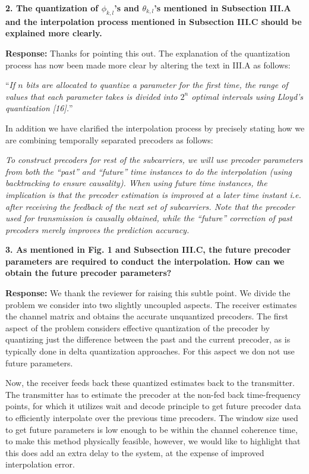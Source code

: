 \documentclass[12pt]{letter}
\begin{document}
\textbf{2. The quantization of $\phi_{k,l}$'s and $\theta_{k,l}$'s mentioned in Subsection III.A and the interpolation
process mentioned in Subsection III.C should be explained more clearly.}

\textbf{Response:}
Thanks for pointing this out. The explanation of the quantization
process has now been made more  clear by altering the text in III.A as
follows:

``\emph{If $n$ bits are allocated to quantize a parameter
for the first time, the range of values that each parameter takes is
divided into $2^n$ optimal intervals using Lloyd's
quantization [16].}''

In addition we have clarified the interpolation process by precisely stating
how we are combining temporally separated precoders as follows:

\emph{To construct precoders for rest of the subcarriers, we will use
precoder parameters from both the ``past'' and ``future'' time
instances to do the interpolation (using backtracking to ensure
causality). When using future time instances, the implication is that the precoder
estimation is improved at a later time instant i.e. after receiving
the feedback of the next set of subcarriers. Note that the precoder
used for transmission is causally obtained, while the ``future''
correction of past precoders merely improves the prediction
accuracy.}

\textbf{3. As mentioned in Fig. 1 and Subsection III.C, the future
  precoder parameters are required to conduct the interpolation. How
  can we obtain the future precoder parameters?}

\textbf{Response:} We thank the reviewer for raising this subtle
point. We divide the problem we consider into two slightly uncoupled
aspects. The receiver estimates the channel matrix and obtains the
accurate unquantized precoders. The first aspect of the problem
considers effective quantization of the precoder by quantizing just
the difference between the past and the current precoder, as is
typically done in delta quantization approaches. For this aspect we
don not use future parameters.

Now, the receiver feeds back these quantized estimates back to the
transmitter. The transmitter has to estimate the precoder at the
non-fed back time-frequency points, for which it utilizes wait and
decode principle to get future precoder data to efficiently
interpolate over the previous time precoders. The window size used to
get future parameters is low enough to be within the channel coherence
time, to make this method physically feasible, however, we would like
to highlight that this does add an extra delay to the system, at the
expense of improved interpolation error.
\end{document}
